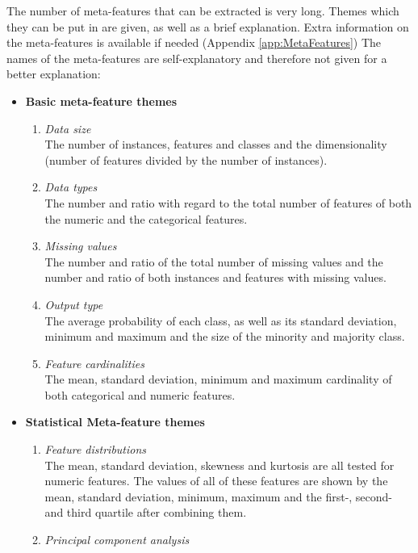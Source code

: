 \documentclass[10pt,a4paper]{report}
\begin{document}
	The number of meta-features that can be extracted is very long. Themes which they can be put in are given, as well as a brief explanation. Extra information on the meta-features is available if needed (Appendix \ref{app:MetaFeatures})  The names of the meta-features are self-explanatory and therefore not given for a better explanation:
	
	\begin{itemize}
		\item \textbf{Basic meta-feature themes}\\
		\begin{enumerate}
			\item \textit{Data size} \\
			The number of instances, features and classes and the dimensionality (number of features divided by the number of instances).
			\item \textit{Data types} \\
			The number and ratio with regard to the total number of features of both the numeric and the categorical features.
			\item \textit{Missing values} \\
			The number and ratio of the total number of missing values and the number and ratio of both instances and features with missing values.
			\item \textit{Output type} \\
			The average probability of each class, as well as its standard deviation, minimum and maximum and the size of the minority and majority class.
			\item \textit{Feature cardinalities} \\
			The mean, standard deviation, minimum and maximum cardinality of both categorical and numeric features.
		\end{enumerate}
		\item \textbf{Statistical Meta-feature themes} \\
		\begin{enumerate}
			\item \textit{Feature distributions} \\
			The mean, standard deviation, skewness and kurtosis are all tested for numeric features. The values of all of these features are shown by the mean, standard deviation, minimum, maximum and the first-, second- and third quartile after combining them.   
			\item \textit{Principal component analysis} \\

\end{enumerate}
\end{itemize}
\end{document}
